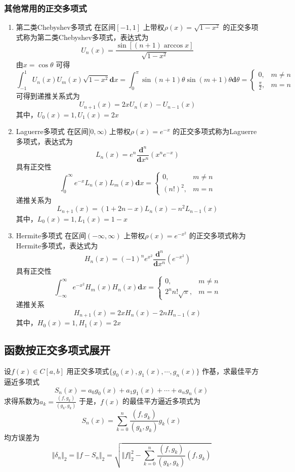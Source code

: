 \documentclass[a4paper]{article}
\begin{document}
\subsubsection{其他常用的正交多项式}
\begin{enumerate}
	\item 第二类Chebyshev多项式
		在区间$[-1,1]$ 上带权$\rho(x) = \sqrt{1 - x^2} $ 的正交多项式称为第二类Chebyshev多项式，表达式为
		\[
			U_n(x) = \frac{\sin[(n+1)\arccos x]}{\sqrt{1 - x^2} }
		\] 
		由$x = \cos \theta$ 可得
		\[
		\int_{-1}^{1} U_n(x) U_m(x) \sqrt{1 - x^2}  \mathbf{d} x = \int_{0}^{\pi} \sin (n+1)\theta \sin (m+1)\theta \mathbf{d} \theta = \begin{cases}
			0, & m \neq n \\
			\frac{\pi}{2}, & m=n
		\end{cases} 
		\] 
		可得到递推关系式为
		\[
			U_{n+1}(x) = 2 x U_n(x) - U_{n-1}(x)
		\] 
		其中，$U_0(x) = 1, U_1(x) = 2x$
	\item Laguerre多项式
		在区间$[0,\infty)$ 上带权$\rho(x) = e^{-x}$ 的正交多项式称为Laguerre多项式，表达式为
		\[
			L_n(x) = e^{n} \frac{\mathbf{d}^{n}}{\mathbf{d}x^{n}} (x^{n} e^{-x})
		\] 
		具有正交性
		\[
		\int_{0}^{\infty} e^{-x}L_n(x) L_m(x) \mathbf{d} x = 
		\begin{cases}
			0, & m \neq n \\
			(n!)^2, & m = n
		\end{cases}
		\] 
		递推关系为
		\[
			L_{n+1}(x) = (1 + 2n - x) L_n(x) - n^2 L_{n-1}(x)
		\] 
		其中，$L_0(x) = 1, L_1(x) = 1 - x$
	\item Hermite多项式
		在区间$(-\infty,\infty)$ 上带权$\rho(x) = e^{-x^2}$ 的正交多项式称为Hermite多项式，表达式为
		\[
		H_n(x) = (-1)^{n} e^{x^2} \frac{\mathbf{d}^{n}}{\mathbf{d}x^{n}}(e^{-x^2})
		\] 
		具有正交性	
		\[
		\int_{-\infty}^{\infty} e^{-x^2} H_m(x) H_n(x) \mathbf{d} x = 
		\begin{cases}
			0, & m \neq n \\
			2^{n} n! \sqrt{\pi} , & m = n
		\end{cases}
		\] 
		递推关系
		\[
			H_{n+1}(x) = 2 x H_n(x) - 2 n H_{n-1}(x)
		\] 
		其中，$H_0(x) = 1, H_1(x) = 2x$
\end{enumerate}

\subsection{函数按正交多项式展开}
设$f(x) \in C[a,b]$ 用正交多项式$\{g_0(x), g_1(x), \cdots, g_n(x)\} $ 作基，求最佳平方逼近多项式
\[
S_n(x) = a_0 g_0(x) + a_1 g_1(x) + \cdots + a_n g_n(x)
\] 
求得系数为$a_k = \frac{(f,g_k)}{(g_k,g_k)}$ 
于是，$f(x)$ 的最佳平方逼近多项式为
\[
S_n(x) = \sum_{k=0}^{n} \frac{(f,g_k)}{(g_k,g_k)} g_k(x)
\] 
均方误差为
\[
\Vert \delta_n \Vert_2 = \Vert f - S_n \Vert_2 = \sqrt{\Vert f \Vert_2^2 - \sum_{k=0}^{n} \frac{(f,g_k)}{(g_k,g_k)}(f,g_k)} 
\] 
\end{document}
